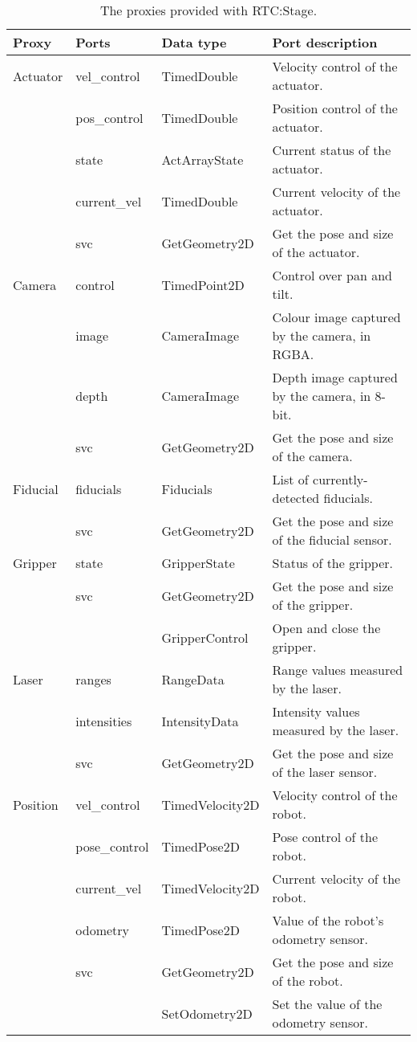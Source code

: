 \documentclass[a4paper,10pt]{article}
\begin{document}
\begin{table}[t]
  \centering
  \begin{tabularx}{\columnwidth}{lllX}
    \toprule
    Proxy & Ports & Data type & Port description \\
    \midrule
    Actuator & vel\_control & TimedDouble & Velocity control of the actuator. \\
     & pos\_control & TimedDouble & Position control of the actuator. \\
     & state & ActArrayState & Current status of the actuator. \\
     & current\_vel & TimedDouble & Current velocity of the actuator. \\
     & svc & GetGeometry2D & Get the pose and size of the actuator. \\
    Camera & control & TimedPoint2D & Control over pan and tilt. \\
     & image & CameraImage & Colour image captured by the camera, in RGBA. \\
     & depth & CameraImage & Depth image captured by the camera, in 8-bit. \\
     & svc & GetGeometry2D & Get the pose and size of the camera. \\
    Fiducial & fiducials & Fiducials & List of currently-detected fiducials. \\
     & svc & GetGeometry2D & Get the pose and size of the fiducial sensor. \\
    Gripper & state & GripperState & Status of the gripper. \\
     & svc & GetGeometry2D & Get the pose and size of the gripper. \\
     & & GripperControl & Open and close the gripper. \\
    Laser & ranges & RangeData & Range values measured by the laser. \\
     & intensities & IntensityData & Intensity values measured by the laser. \\
     & svc & GetGeometry2D & Get the pose and size of the laser sensor. \\
    Position & vel\_control & TimedVelocity2D & Velocity control of the robot. \\
     & pose\_control & TimedPose2D & Pose control of the robot. \\
     & current\_vel & TimedVelocity2D & Current velocity of the robot. \\
     & odometry & TimedPose2D & Value of the robot's odometry sensor. \\
     & svc & GetGeometry2D & Get the pose and size of the robot. \\
     & & SetOdometry2D & Set the value of the odometry sensor. \\
    \bottomrule
  \end{tabularx}
  \caption{The proxies provided with RTC:Stage.}
  \label{tab:proxies}
\end{table}
\end{document}
